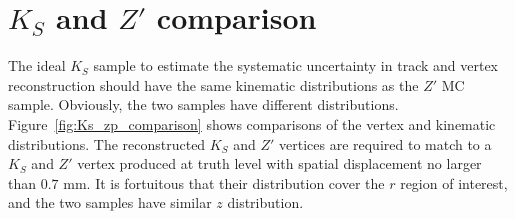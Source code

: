 \section{\texorpdfstring{$K_{S}$}{Ks} and \texorpdfstring{$Z'$}{Z'} comparison}
\label{app:syst_Ks_Zp}

The ideal $K_{S}$ sample to estimate the systematic uncertainty in track and vertex reconstruction should have the same kinematic distributions as the $Z'$ MC sample. Obviously, the two samples have different distributions. Figure~\ref{fig:Ks_zp_comparison} shows comparisons of the vertex and kinematic distributions. The reconstructed $K_{S}$ and $Z'$ vertices are required to match to a $K_{S}$ and $Z'$ vertex produced at truth level with spatial displacement no larger than $0.7$ mm. It is fortuitous that their distribution cover the $r$ region of interest, and the two samples have similar $z$ distribution.



